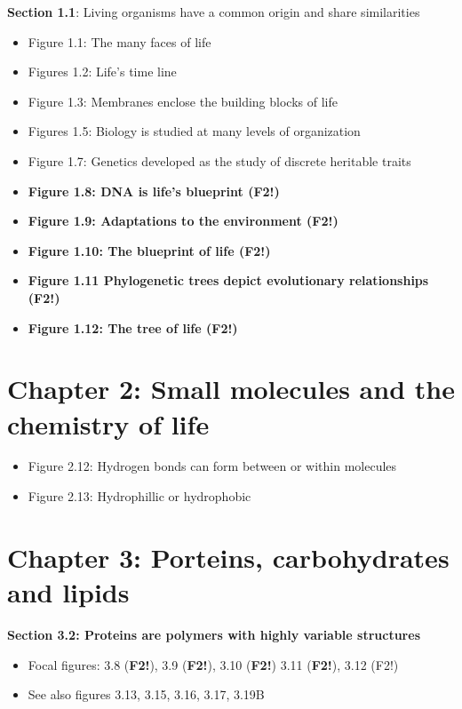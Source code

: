 \documentclass[
]{book}
\providecommand{\tightlist}{%
  \setlength{\itemsep}{0pt}\setlength{\parskip}{0pt}}
\begin{document}
\textbf{Section 1.1}: Living organisms have a common origin and share similarities

\begin{itemize}
\tightlist
\item
  Figure 1.1: The many faces of life
\item
  Figures 1.2: Life's time line
\item
  Figure 1.3: Membranes enclose the building blocks of life
\item
  Figures 1.5: Biology is studied at many levels of organization
\item
  Figure 1.7: Genetics developed as the study of discrete heritable traits
\item
  \textbf{Figure 1.8: DNA is life's blueprint (F2!)}
\item
  \textbf{Figure 1.9: Adaptations to the environment (F2!)}
\item
  \textbf{Figure 1.10: The blueprint of life (F2!)}
\item
  \textbf{Figure 1.11 Phylogenetic trees depict evolutionary relationships (F2!)}
\item
  \textbf{Figure 1.12: The tree of life (F2!)}
\end{itemize}

\hypertarget{chapter-2-small-molecules-and-the-chemistry-of-life}{%
\section{Chapter 2: Small molecules and the chemistry of life}\label{chapter-2-small-molecules-and-the-chemistry-of-life}}

\begin{itemize}
\tightlist
\item
  Figure 2.12: Hydrogen bonds can form between or within molecules
\item
  Figure 2.13: Hydrophillic or hydrophobic
\end{itemize}

\hypertarget{chapter-3-porteins-carbohydrates-and-lipids}{%
\section{Chapter 3: Porteins, carbohydrates and lipids}\label{chapter-3-porteins-carbohydrates-and-lipids}}

\textbf{Section 3.2: Proteins are polymers with highly variable structures }

\begin{itemize}
\tightlist
\item
  Focal figures: 3.8 (\textbf{F2!}), 3.9 (\textbf{F2!}), 3.10 (\textbf{F2!}) 3.11 (\textbf{F2!}), 3.12 (F2!)
\item
  See also figures 3.13, 3.15, 3.16, 3.17, 3.19B
\end{itemize}
\end{document}
